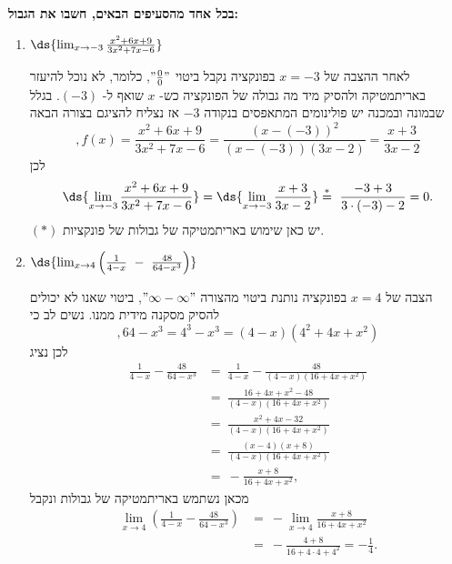 \textbf{
בכל אחד מהסעיפים הבאים,
חשבו את הגבול:}

\begin{enumerate}
\item
$\ds{
\lim_{x\to -3}\frac{x^2+6x+9}{3x^2+7x-6}
} $
\ifsol
\begin{solbox}
לאחר ההצבה של
$x=-3$
בפונקציה נקבל ביטוי
$"\tfrac{0}{0}"$,
כלומר, לא נוכל להיעזר באריתמטיקה ולהסיק מיד מה גבולה של הפונקציה כש-
$x$
שואף ל-
$(-3)$.
בגלל שבמונה ובמכנה יש פולינומים המתאפסים בנקודה
$-3$
אז נצליח להציגם בצורה הבאה
$$,f(x)=\frac{x^2+6x+9}{3x^2+7x-6}=\frac{(x-(-3))^2}{(x-(-3))(3x-2)}=\frac{x+3}{3x-2}$$
לכן
\begin{align*}
\ds{
\lim_{x\to -3}\frac{x^2+6x+9}{3x^2+7x-6}
}
= \ds{
\lim_{x\to -3}\frac{x+3}{3x-2}}
\overset{\ast}{=}\ \frac{-3+3}{3\cdot(-3)-2}
= 0.
\end{align*}
$(\ast)$
יש כאן שימוש באריתמטיקה של גבולות של פונקציות.
\end{solbox}
\fi

\item
$\ds{
\lim_{x\to 4} \left( \frac{1}{4-x} \ - \  \frac{48}{64-x^3} \right)
} $
\ifsol
{}
\begin{solbox}
הצבה של
$x=4$
בפונקציה נותנת ביטוי מהצורה
$"\infty-\infty"$,
ביטוי שאנו לא יכולים להסיק מסקנה מידית ממנו.
נשים לב כי
$$,64-x^3=4^3-x^3=(4-x)(4^2+4x+x^2)$$
לכן
נציג
\begin{align*}
    \frac{1}{4-x}-\frac{48}{64-x^3}&=\ \frac{1}{4-x}-\frac{48}{(4-x)(16+4x+x^2)}\\
    &=\ \frac{16+4x+x^2-48}{(4-x)(16+4x+x^2)}\\
    &=\ \frac{x^2+4x-32}{(4-x)(16+4x+x^2)}\\
    &=\ \frac{(x-4)(x+8)}{(4-x)(16+4x+x^2)}\\
    &=\ -\frac{x+8}{16+4x+x^2},
\end{align*}
מכאן
נשתמש באריתמטיקה של גבולות ונקבל
\begin{align*}
   \lim_{x\to 4}\left(\frac{1}{4-x}-\frac{48}{64-x^3}\right)&=\ -\lim_{x\to 4}\frac{x+8}{16+4x+x^2}\\
   &=\ -\frac{4+8}{16+4\cdot4+4^2}
   = -\frac{1}{4}.
\end{align*}
\end{solbox}
\fi


\end{enumerate}
